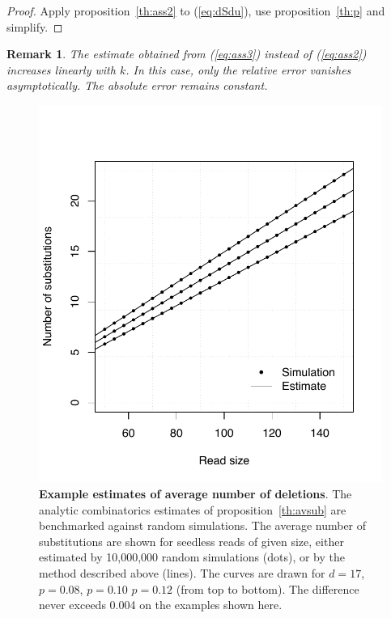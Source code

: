 \documentclass{article}
\newtheorem{remark}{Remark}
\begin{document}
\begin{proof}
Apply proposition~\ref{th:ass2} to (\ref{eq:dSdu}), use
proposition~\ref{th:p} and simplify.
\end{proof}

\begin{remark}
The estimate obtained from (\ref{eq:ass3}) instead of (\ref{eq:ass2})
increases linearly with $k$. In this case, only the relative error
vanishes asymptotically. The absolute error remains constant.
\end{remark}


\begin{figure}[h]
\centering
\includegraphics[scale=0.445]{simulp-average.pdf}
\caption{\textbf{Example estimates of average number of deletions}. The
analytic combinatorics estimates of proposition~\ref{th:avsub} are
benchmarked against random simulations.  The average number of
substitutions are shown for seedless reads of given size, either estimated
by 10,000,000 random simulations (dots), or by the method described above
(lines). The curves are drawn for $d=17$, $p=0.08$, $p=0.10$ $p=0.12$
(from top to bottom). The difference never exceeds 0.004 on the examples
shown here.}
\label{fig:simulpdel}
\end{figure}
\end{document}
